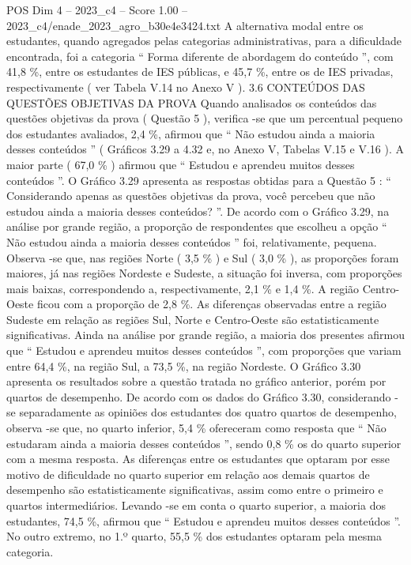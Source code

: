 \begin{textsample}{POS Dim 4 – 2023\_c4 – Score 1.00 – 2023\_c4/enade\_2023\_agro\_b30e4e3424.txt}
A alternativa modal entre os estudantes, quando agregados pelas categorias administrativas, para a dificuldade encontrada, foi a categoria “ Forma diferente de abordagem do conteúdo ”, com 41,8 \%, entre os estudantes de IES públicas, e 45,7 \%, entre os de IES privadas, respectivamente ( ver Tabela V.14 no Anexo V ). 3.6 CONTEÚDOS DAS QUESTÕES OBJETIVAS DA PROVA Quando analisados os conteúdos das questões objetivas da prova ( Questão 5 ), verifica -se que um percentual pequeno dos estudantes avaliados, 2,4 \%, afirmou que “ Não estudou ainda a maioria desses conteúdos ” ( Gráficos 3.29 a 4.32 e, no Anexo V, Tabelas V.15 e V.16 ).
A maior parte ( 67,0 \% ) afirmou que “ Estudou e aprendeu muitos desses conteúdos ”.
O Gráfico 3.29 apresenta as respostas obtidas para a Questão 5 : “ Considerando apenas as questões objetivas da prova, você percebeu que não estudou ainda a maioria desses conteúdos? ”.
De acordo com o Gráfico 3.29, na análise por grande região, a proporção de respondentes que escolheu a opção “ Não estudou ainda a maioria desses conteúdos ” foi, relativamente, pequena.
Observa -se que, nas regiões Norte ( 3,5 \% ) e Sul ( 3,0 \% ), as proporções foram maiores, já nas regiões Nordeste e Sudeste, a situação foi inversa, com proporções mais baixas, correspondendo a, respectivamente, 2,1 \% e 1,4 \%.
A região Centro-Oeste ficou com a proporção de 2,8 \%.
As diferenças observadas entre a região Sudeste em relação as regiões Sul, Norte e Centro-Oeste são estatisticamente significativas.
Ainda na análise por grande região, a maioria dos presentes afirmou que “ Estudou e aprendeu muitos desses conteúdos ”, com proporções que variam entre 64,4 \%, na região Sul, a 73,5 \%, na região Nordeste.
O Gráfico 3.30 apresenta os resultados sobre a questão tratada no gráfico anterior, porém por quartos de desempenho.
De acordo com os dados do Gráfico 3.30, considerando -se separadamente as opiniões dos estudantes dos quatro quartos de desempenho, observa -se que, no quarto inferior, 5,4 \% ofereceram como resposta que “ Não estudaram ainda a maioria desses conteúdos ”, sendo 0,8 \% os do quarto superior com a mesma resposta.
As diferenças entre os estudantes que optaram por esse motivo de dificuldade no quarto superior em relação aos demais quartos de desempenho são estatisticamente significativas, assim como entre o primeiro e quartos intermediários.
Levando -se em conta o quarto superior, a maioria dos estudantes, 74,5 \%, afirmou que “ Estudou e aprendeu muitos desses conteúdos ”.
No outro extremo, no 1.º quarto, 55,5 \% dos estudantes optaram pela mesma categoria.

\end{textsample}
